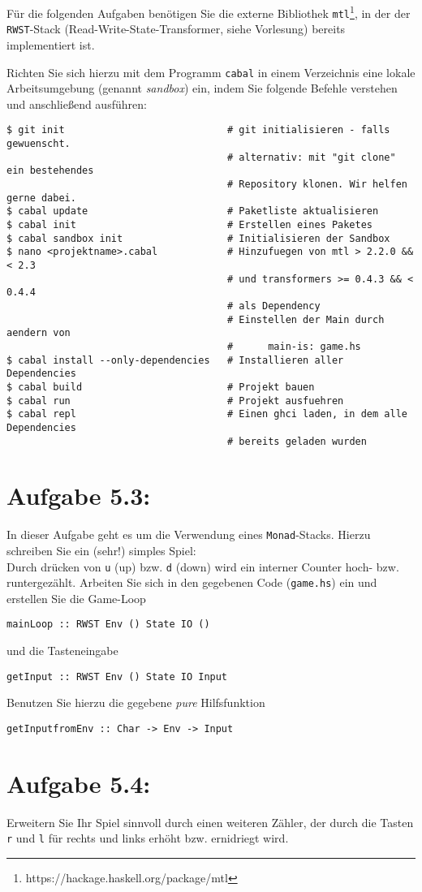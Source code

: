 \documentclass[a4paper,10pt]{scrartcl}
\newcommand{\theuebungszettel}{5}
\begin{document}
Für die folgenden Aufgaben benötigen Sie die externe Bibliothek \texttt{mtl}\footnote{https://hackage.haskell.org/package/mtl}, in der der \texttt{RWST}-Stack (Read-Write-State-Transformer, siehe Vorlesung) bereits implementiert ist.\bigskip

Richten Sie sich hierzu mit dem Programm \texttt{cabal} in einem Verzeichnis eine lokale Arbeitsumgebung (genannt \emph{sandbox}) ein, indem Sie folgende Befehle verstehen und anschließend ausführen:
\begin{verbatim}
$ git init                            # git initialisieren - falls gewuenscht.
                                      # alternativ: mit "git clone" ein bestehendes
                                      # Repository klonen. Wir helfen gerne dabei.
$ cabal update                        # Paketliste aktualisieren
$ cabal init                          # Erstellen eines Paketes
$ cabal sandbox init                  # Initialisieren der Sandbox
$ nano <projektname>.cabal            # Hinzufuegen von mtl > 2.2.0 && < 2.3
                                      # und transformers >= 0.4.3 && < 0.4.4
                                      # als Dependency
                                      # Einstellen der Main durch aendern von
                                      #      main-is: game.hs
$ cabal install --only-dependencies   # Installieren aller Dependencies
$ cabal build                         # Projekt bauen
$ cabal run                           # Projekt ausfuehren
$ cabal repl                          # Einen ghci laden, in dem alle Dependencies
                                      # bereits geladen wurden
\end{verbatim}

\section*{Aufgabe \theuebungszettel.3:}
In dieser Aufgabe geht es um die Verwendung eines \texttt{Monad}-Stacks. Hierzu schreiben Sie ein (sehr!) simples Spiel:\\
Durch drücken von \texttt{u} (up) bzw. \texttt{d} (down) wird ein interner Counter hoch- bzw. runtergezählt. Arbeiten Sie sich in den gegebenen Code (\texttt{game.hs}) ein und erstellen Sie die Game-Loop
\begin{verbatim}
mainLoop :: RWST Env () State IO ()
\end{verbatim}
und die Tasteneingabe
\begin{verbatim}
getInput :: RWST Env () State IO Input
\end{verbatim}
Benutzen Sie hierzu die gegebene \emph{pure} Hilfsfunktion
\begin{verbatim}
getInputfromEnv :: Char -> Env -> Input
\end{verbatim}
\section*{Aufgabe \theuebungszettel.4:}
Erweitern Sie Ihr Spiel sinnvoll durch einen weiteren Zähler, der durch die Tasten \texttt{r} und \texttt{l} für rechts und links erhöht bzw. ernidriegt wird.
\end{document}

